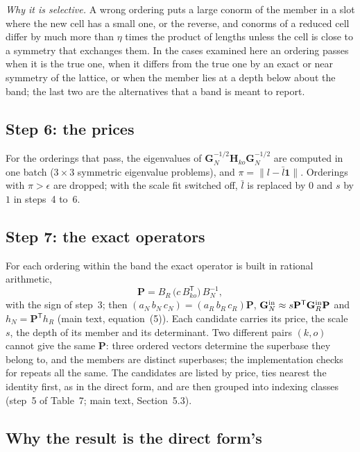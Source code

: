 \documentclass[preprint,pdf]{iucr}          %
\newcommand{\Gmet}{\mathbf{G}}
\newcommand{\Pop}{\mathbf{P}}
\begin{document}
\emph{Why it is selective.} A wrong ordering puts a large conorm of the member in a slot where the new cell has a small one, or the reverse, and conorms of a reduced cell differ by much more than $\eta$ times the product of lengths unless the cell is close to a symmetry that exchanges them. In the cases examined here an ordering passes when it is the true one, when it differs from the true one by an exact or near symmetry of the lattice, or when the member lies at a depth below about the band; the last two are the alternatives that a band is meant to report.

\subsection{Step 6: the prices}

For the orderings that pass, the eigenvalues of $\Gmet_N^{-1/2}\mathbf H_{ko}\Gmet_N^{-1/2}$ are computed in one batch ($3\times3$ symmetric eigenvalue problems), and $\pi=\|l-\bar l\mathbf 1\|$. Orderings with $\pi>\epsilon$ are dropped; with the scale fit switched off, $\bar l$ is replaced by $0$ and $s$ by $1$ in steps~4 to~6.

\subsection{Step 7: the exact operators}

For each ordering within the band the exact operator is built in rational arithmetic,
\begin{equation}
\Pop=B_R\,\bigl(c\,B_{ko}^{\mathsf T}\bigr)\,B_N^{-1},
\end{equation}
with the sign of step~3; then $(a_N\,b_N\,c_N)=(a_R\,b_R\,c_R)\Pop$, $\Gmet_N^{\rm in}\approx s\Pop^{\mathsf T}\Gmet_R^{\rm in}\Pop$ and $h_N=\Pop^{\mathsf T}h_R$ (main text, equation~(5)). Each candidate carries its price, the scale $s$, the depth of its member and its determinant. Two different pairs $(k,o)$ cannot give the same $\Pop$: three ordered vectors determine the superbase they belong to, and the members are distinct superbases; the implementation checks for repeats all the same. The candidates are listed by price, ties nearest the identity first, as in the direct form, and are then grouped into indexing classes (step~5 of Table~7; main text, Section~5.3).

\subsection{Why the result is the direct form's}
\end{document}
